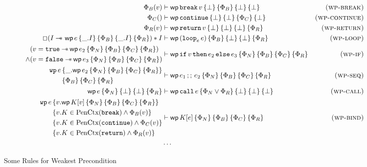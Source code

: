 \documentclass{article}
\numberwithin{algorithm}{section}
\newcommand{\progspec}[1]{\{ #1 \}}
\newcommand{\true}{\texttt{true}}
\newcommand{\false}{\texttt{false}}
\newcommand{\cloop}[1]{\texttt{loop}_{#1}\,}
\newcommand{\cbreak}{\texttt{break}\,}
\newcommand{\ccontinue}{\texttt{continue}}
\newcommand{\cif}{\texttt{if}\,}
\newcommand{\cthen}{\,\texttt{then}\,}
\newcommand{\celse}{\,\texttt{else}\,}
\newcommand{\cseq}{\,;;\,}
\newcommand{\creturn}{\texttt{return}\,}
\newcommand{\ccall}{\texttt{call}\,}
\newcommand{\pure}[1]{\text{PenCtx}(#1)}
\newcommand{\cred}{\text{red}}
\newcommand{\wand}{-\mkern-8mu*\,}
\newcommand{\wpre}[5]{\textsf{wp}\, #1\, \progspec{#2}\, \progspec{#3}\, \progspec{#4}\, \progspec{#5}}
\begin{document}


\begin{figure}[h]
    $$
    \begin{aligned}
        \Phi_B(v) &\vdash \wpre{\cbreak v}{\bot}{\Phi_B}{\bot}{\bot} & \textsc{(wp-break)} \\
        \Phi_C() &\vdash \wpre{\ccontinue}{\bot}{\bot}{\Phi_C}{\bot} & \textsc{(wp-continue)} \\
        \Phi_R(v) &\vdash \wpre{\creturn v}{\bot}{\bot}{\bot}{\Phi_R} & \textsc{(wp-return)} \\
        \Box(I \wand{}\, \wpre{e}{\_. I}{\Phi_B}{\_. I}{\Phi_R}) * I &\vdash \wpre{(\cloop{e}e)}{\Phi_B}{\bot}{\bot}{\Phi_R} & \textsc{(wp-loop)} \\
        \begin{aligned}
            &(v = \true \wand \wpre{e_2}{\Phi_N}{\Phi_B}{\Phi_C}{\Phi_R}) \\
            \land &(v = \false \wand \wpre{e_3}{\Phi_N}{\Phi_B}{\Phi_C}{\Phi_R})
        \end{aligned} &\vdash \wpre{\cif v \cthen e_2 \celse e_3}{\Phi_N}{\Phi_B}{\Phi_C}{\Phi_R} & \textsc{(wp-if)} \\
        \begin{aligned}
            \texttt{wp}\,e\,& \progspec{\_.\wpre{e_2}{\Phi_N}{\Phi_B}{\Phi_C}{\Phi_R}} \\
                            & \progspec{\Phi_B}\,\progspec{\Phi_C}\,\progspec{\Phi_R}
        \end{aligned} &\vdash \wpre{e_1 \cseq e_2}{\Phi_N}{\Phi_B}{\Phi_C}{\Phi_R} & \textsc{(wp-seq)} \\
        \wpre{e}{\Phi_N}{\bot}{\bot}{\Phi_R} &\vdash \wpre{\ccall e}{\Phi_N \lor \Phi_R}{\bot}{\bot}{\bot} & \textsc{(wp-call)} \\
        \begin{aligned}
            \texttt{wp}\,e\,& \progspec{v. \wpre{K[v]}{\Phi_N}{\Phi_B}{\Phi_C}{\Phi_R}} \\
                            & \progspec{v. K \in \pure{\cbreak\!} \land \Phi_B(v)} \\
                            & \progspec{v. K \in \pure{\ccontinue} \land \Phi_C(v)} \\
                            & \progspec{v. K \in \pure{\creturn\!} \land \Phi_R(v)}
        \end{aligned} &\vdash \wpre{K[e]}{\Phi_N}{\Phi_B}{\Phi_C}{\Phi_R} & \textsc{(wp-bind)} \\
        &\cdots
    \end{aligned}
    $$
    \caption{Some Rules for Weakest Precondition}
    \label{fig:wp-rules}
\end{figure}
\end{document}
